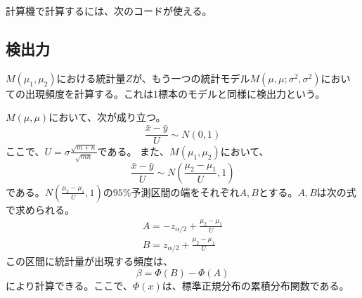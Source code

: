 計算機で計算するには、次のコードが使える。




\begin{comment}
$Z$の不等式を変形していくと、次がわかる
\begin{equation*}
    (\bar{X}-\bar{Y})-z_{0.025}\sigma\sqrt{\frac{1}{n_1}+\frac{1}{n_2}} \leq \mu_2-\mu_1 \leq (\bar{X}-\bar{Y})+z_{0.025}\sigma\sqrt{\frac{1}{n_1}+\frac{1}{n_2}}.
\end{equation*}
この式の意味は、何だっけ？？？TODO
\end{comment}


\subsection{検出力}
$M(\mu_1,\mu_2)$における統計量$Z$が、もう一つの統計モデル$M(\mu,\mu;\sigma^2,\sigma^2)$においての出現頻度を計算する。これは1標本のモデルと同様に検出力という。

$M(\mu,\mu)$において、次が成り立つ。
\begin{equation*}
    \frac{\bar{x}-\bar{y}}{U} \sim N(0,1)
\end{equation*}
ここで、$U=\sigma\frac{\sqrt{m+n}}{\sqrt{mn}}$である。
また、$M(\mu_1,\mu_2)$において、
\begin{equation*}
    \frac{\bar{x}-\bar{y}}{U}\sim N(\frac{\mu_2-\mu_1}{U},1)
\end{equation*}
である。$N(\frac{\mu_2-\mu_1}{U},1)$の$95\%$予測区間の端をそれぞれ$A,B$とする。$A,B$は次の式で求められる。
\begin{eqnarray*}
    A = -z_{\alpha/2}+\frac{\mu_2-\mu_1}{U}\\
    B = z_{\alpha/2}+\frac{\mu_2-\mu_1}{U}
\end{eqnarray*}
この区間に統計量が出現する頻度は、
\begin{equation*}
    \beta = \varPhi(B)-\varPhi(A)
\end{equation*}
により計算できる。ここで、$\varPhi(x)$は、標準正規分布の累積分布関数である。



